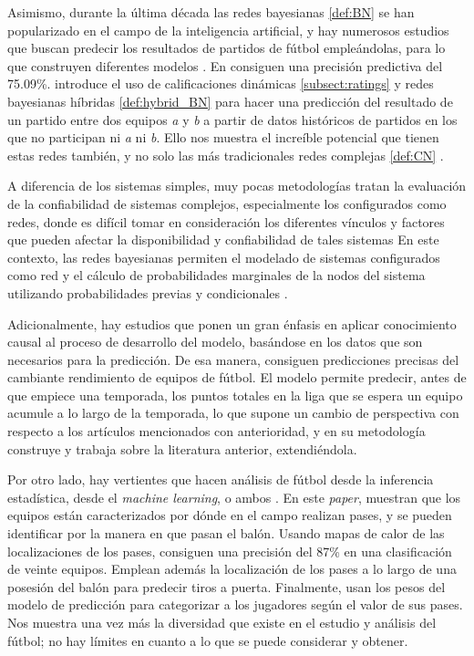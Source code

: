 Asimismo, durante la última década las redes bayesianas \ref{def:BN} se han popularizado en el campo 
de la inteligencia artificial, y hay numerosos estudios que buscan predecir los resultados 
de partidos de fútbol empleándolas, para lo que construyen diferentes modelos \cite{prediction-barcelona}.
En \cite{razali-2017} consiguen una precisión predictiva del 75.09\%. \cite{dolores} introduce el uso 
de calificaciones dinámicas \ref{subsect:ratings} y redes bayesianas híbridas \ref{def:hybrid_BN} para hacer una predicción del resultado de un 
partido entre dos equipos \textit{a} y \textit{b} a partir de datos históricos de partidos 
en los que no participan ni \textit{a} ni \textit{b}. Ello nos muestra 
el increíble potencial que tienen estas redes también, y no solo las más tradicionales 
redes complejas \ref{def:CN} \cite{caldarelli2007scale}. 

A diferencia de los sistemas simples, muy pocas metodologías tratan la evaluación de la confiabilidad de
sistemas complejos, especialmente los configurados como redes, donde es difícil tomar en
consideración los diferentes vínculos y factores que pueden afectar la disponibilidad y confiabilidad de tales
sistemas En este contexto, las redes bayesianas permiten el
modelado de sistemas configurados como red y el cálculo de probabilidades marginales de la
nodos del sistema utilizando probabilidades previas y condicionales \cite{bn-and-cn}.

Adicionalmente, hay estudios \cite{smart-data} que ponen un gran énfasis 
en aplicar conocimiento causal al proceso de desarrollo del modelo, basándose 
en los datos que son necesarios para la predicción. De esa manera, consiguen predicciones precisas 
del cambiante rendimiento de equipos de fútbol. El modelo permite predecir, antes de que empiece 
una temporada, los puntos totales en la liga que se espera un equipo acumule a lo largo de la temporada, lo 
que supone un cambio de perspectiva con respecto a los artículos mencionados con anterioridad, y en su 
metodología construye y trabaja sobre la literatura anterior, extendiéndola.

Por otro lado, hay vertientes que hacen análisis de fútbol desde la inferencia estadística, desde 
el \textit{machine learning}, o ambos \cite{ML-inference}. En este \textit{paper}, muestran que 
los equipos están caracterizados por dónde en el campo realizan pases, y se 
pueden identificar por la manera en que pasan el balón. Usando mapas de calor de las localizaciones 
de los pases, consiguen una precisión del 87\% en una clasificación de veinte equipos. Emplean 
además la localización de los pases a lo largo de una posesión del balón para predecir tiros a 
puerta. Finalmente, usan los pesos del modelo de predicción para categorizar a los jugadores 
según el valor de sus pases. Nos muestra una vez más la diversidad que existe en el estudio 
y análisis del fútbol; no hay límites en cuanto a lo que se puede considerar y obtener.

